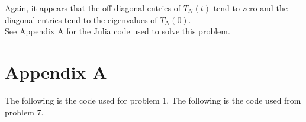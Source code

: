 \documentclass{article}
\begin{document}
Again, it appears that the off-diagonal entries of $T_N(t)$ tend to zero and the diagonal entries tend to the eigenvalues of $T_N(0)$.\\
See Appendix A for the Julia code used to solve this problem.

\section{Appendix A}
The following is the code used for problem 1.
The following is the code used from problem 7. 
\end{document}
